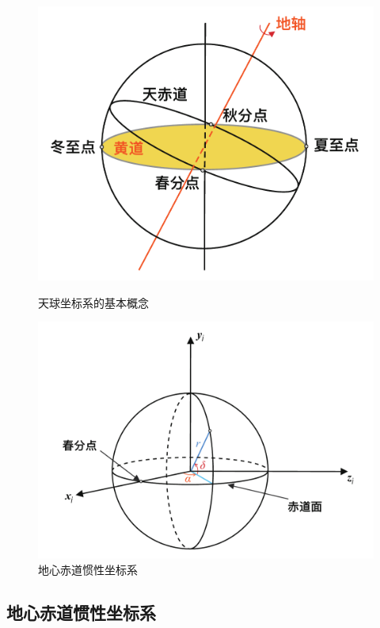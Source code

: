 \begin{figure}[!htb]
	\begin{minipage}{0.45\linewidth}
		\centering
		\includegraphics[width=\linewidth]{pic/基本概念}
		\caption{天球坐标系的基本概念}
		\label{基本概念}
	\end{minipage}
	\begin{minipage}{0.55\linewidth}
		\centering
		\includegraphics[width=\linewidth]{pic/地惯}
		\vspace*{-2.9em}
		\caption{地心赤道惯性坐标系}
		\label{地惯}
	\end{minipage}
\end{figure}


\subsection{地心赤道惯性坐标系}
\vspace*{-1em}

